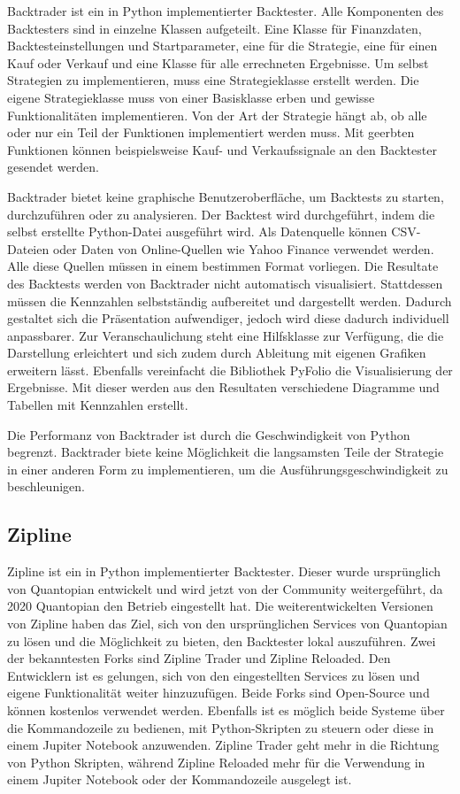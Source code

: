 Backtrader ist ein in Python implementierter Backtester. Alle Komponenten des Backtesters sind in einzelne Klassen aufgeteilt. 
Eine Klasse für Finanzdaten, Backtesteinstellungen und Startparameter, eine für die Strategie, eine für einen Kauf oder Verkauf und eine Klasse für alle errechneten Ergebnisse.
Um selbst Strategien zu implementieren, muss eine Strategieklasse erstellt werden.
Die eigene Strategieklasse muss von einer Basisklasse erben und gewisse Funktionalitäten implementieren. Von der Art der Strategie hängt ab, ob alle oder nur ein Teil der Funktionen implementiert werden muss.
Mit geerbten Funktionen können beispielsweise Kauf- und Verkaufssignale an den Backtester gesendet werden.

Backtrader bietet keine graphische Benutzeroberfläche, um Backtests zu starten, durchzuführen oder zu analysieren. Der Backtest wird durchgeführt, indem die selbst erstellte Python-Datei ausgeführt wird. 
Als Datenquelle können CSV-Dateien oder Daten von Online-Quellen wie Yahoo Finance verwendet werden. Alle diese Quellen müssen in einem bestimmen Format vorliegen.
Die Resultate des Backtests werden von Backtrader nicht automatisch visualisiert. Stattdessen müssen die Kennzahlen selbstständig aufbereitet und dargestellt werden. Dadurch gestaltet sich die Präsentation aufwendiger, jedoch wird diese dadurch individuell anpassbarer. 
Zur Veranschaulichung steht eine Hilfsklasse zur Verfügung, die die Darstellung erleichtert und sich zudem durch Ableitung mit eigenen Grafiken erweitern lässt.
Ebenfalls vereinfacht die Bibliothek PyFolio die Visualisierung der Ergebnisse. Mit dieser werden aus den Resultaten verschiedene Diagramme und Tabellen mit Kennzahlen erstellt.
\cite{backtraderGitHub} \cite{backtraderWebsite} \cite{pyFolioGitHub}

Die Performanz von Backtrader ist durch die Geschwindigkeit von Python begrenzt.
Backtrader biete keine Möglichkeit die langsamsten Teile der Strategie in einer anderen Form zu implementieren, um die Ausführungsgeschwindigkeit zu beschleunigen.

\subsection{Zipline}
\label{subsec:Zipline}

Zipline ist ein in Python implementierter Backtester. Dieser wurde ursprünglich von Quantopian entwickelt und wird jetzt von der Community weitergeführt, da 2020 Quantopian den Betrieb eingestellt hat.
Die weiterentwickelten Versionen von Zipline haben das Ziel, sich von den ursprünglichen Services von Quantopian zu lösen und die Möglichkeit zu bieten, den Backtester lokal auszuführen.
Zwei der bekanntesten Forks sind Zipline Trader und Zipline Reloaded. Den Entwicklern ist es gelungen, sich von den eingestellten Services zu lösen und eigene Funktionalität weiter hinzuzufügen.
Beide Forks sind Open-Source und können kostenlos verwendet werden. Ebenfalls ist es möglich beide Systeme über die Kommandozeile zu bedienen, mit Python-Skripten zu steuern oder diese in einem Jupiter Notebook anzuwenden.
Zipline Trader geht mehr in die Richtung von Python Skripten, während Zipline Reloaded mehr für die Verwendung in einem Jupiter Notebook oder der Kommandozeile ausgelegt ist.


